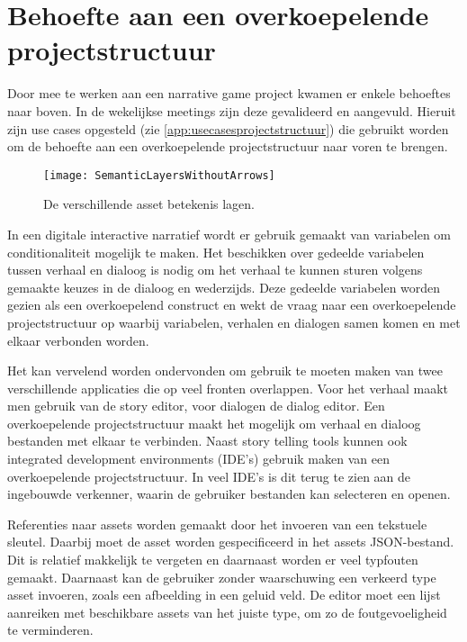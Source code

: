\section{Behoefte aan een overkoepelende projectstructuur}
Door mee te werken aan een narrative game project kwamen er enkele behoeftes naar boven. In de wekelijkse meetings zijn deze gevalideerd en aangevuld. Hieruit zijn use cases opgesteld (zie \autoref{app:usecasesprojectstructuur}) die gebruikt worden om de behoefte aan een overkoepelende projectstructuur naar voren te brengen. 

\begin{wrapfigure}{r}{0.35\textwidth}
    \texttt{[image: SemanticLayersWithoutArrows]}
    \caption{De verschillende asset betekenis lagen.}
    \label{fig:semanticgamecontentlayersdetailed}
    \centering
\end{wrapfigure}

In een digitale interactive narratief wordt er gebruik gemaakt van variabelen om conditionaliteit mogelijk te maken. Het beschikken over gedeelde variabelen tussen verhaal en dialoog is nodig om het verhaal te kunnen sturen volgens gemaakte keuzes in de dialoog en wederzijds. Deze gedeelde variabelen worden gezien als een overkoepelend construct en wekt de vraag naar een overkoepelende projectstructuur op waarbij variabelen, verhalen en dialogen samen komen en met elkaar verbonden worden.

Het kan vervelend worden ondervonden om gebruik te moeten maken van twee verschillende applicaties die op veel fronten overlappen. Voor het verhaal maakt men gebruik van de story editor, voor dialogen de dialog editor. Een overkoepelende projectstructuur maakt het mogelijk om verhaal en dialoog bestanden met elkaar te verbinden. Naast story telling tools kunnen ook integrated development environments (IDE's) gebruik maken van een overkoepelende projectstructuur. In veel IDE's is dit terug te zien aan de ingebouwde verkenner, waarin de gebruiker bestanden kan selecteren en openen.

Referenties naar assets worden gemaakt door het invoeren van een tekstuele sleutel. Daarbij moet de asset worden gespecificeerd in het assets JSON-bestand. Dit is relatief makkelijk te vergeten en daarnaast worden er veel typfouten gemaakt. Daarnaast kan de gebruiker zonder waarschuwing een verkeerd type asset invoeren, zoals een afbeelding in een geluid veld. De editor moet een lijst aanreiken met beschikbare assets van het juiste type, om zo de foutgevoeligheid te verminderen.


